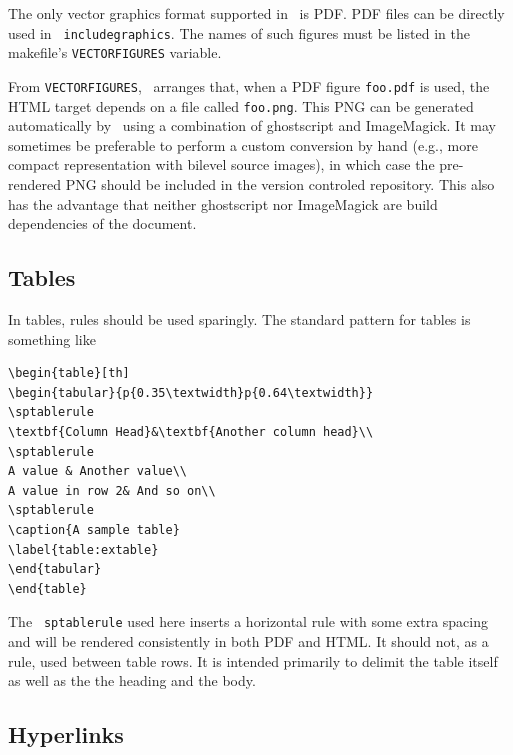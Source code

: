 \documentclass[11pt,a4paper]{ivoa}
\newcommand{\texword}[1]{\texttt{\color{texcolor} #1}}
\begin{document}
The only vector graphics format supported in \ivoatex\ is PDF.  PDF
files can be directly used in \texword{includegraphics}.  The names of
such figures must be listed in the makefile's \texttt{VECTORFIGURES}
variable.

From \texttt{VECTORFIGURES}, \ivoatex\ arranges that, when a PDF figure 
\texttt{foo.pdf} is used, the HTML target depends on a file called
\texttt{foo.png}.  This PNG can be generated automatically by
\ivoatex\ using a combination of ghostscript and ImageMagick.  It may
sometimes be preferable to perform a custom conversion by hand (e.g.,
more compact representation with bilevel source images), in which case
the pre-rendered PNG should be included in the version controled
repository.  This also
has the advantage that neither ghostscript nor ImageMagick are build
dependencies of the document.

\subsection{Tables}

In tables, rules should be used sparingly.  The standard pattern for tables is
something like
\begin{lstlisting}
\begin{table}[th]
\begin{tabular}{p{0.35\textwidth}p{0.64\textwidth}}
\sptablerule
\textbf{Column Head}&\textbf{Another column head}\\
\sptablerule
A value & Another value\\
A value in row 2& And so on\\
\sptablerule
\caption{A sample table}
\label{table:extable}
\end{tabular}
\end{table}
\end{lstlisting}

The \texword{sptablerule} used here inserts a horizontal rule with some
extra spacing and will be rendered consistently in both PDF and HTML.
It should not, as a rule, used between table rows. It is intended
primarily to delimit the table itself as well as the the heading and the
body.

\subsection{Hyperlinks}
\label{sect:links}
\end{document}
